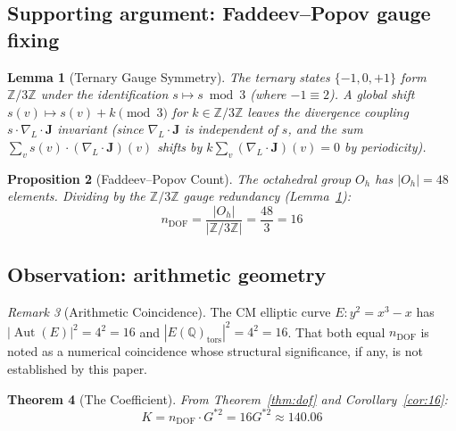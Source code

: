 \documentclass[12pt]{article}
\newtheorem{theorem}{Theorem}[section]
\newtheorem{proposition}[theorem]{Proposition}
\newtheorem{lemma}[theorem]{Lemma}
\theoremstyle{definition}
\theoremstyle{remark}
\newtheorem{remark}[theorem]{Remark}
\begin{document}
\subsection{Supporting argument: Faddeev--Popov gauge fixing}

\begin{lemma}[Ternary Gauge Symmetry]
\label{lem:z3}
The ternary states $\{-1, 0, +1\}$ form $\mathbb{Z}/3\mathbb{Z}$ under the identification $s \mapsto s \bmod 3$ (where $-1 \equiv 2$). A global shift $s(v) \mapsto s(v) + k \pmod{3}$ for $k \in \mathbb{Z}/3\mathbb{Z}$ leaves the divergence coupling $s \cdot \nabla_L \cdot \mathbf{J}$ invariant (since $\nabla_L \cdot \mathbf{J}$ is independent of $s$, and the sum $\sum_v s(v) \cdot (\nabla_L \cdot \mathbf{J})(v)$ shifts by $k \sum_v (\nabla_L \cdot \mathbf{J})(v) = 0$ by periodicity).
\end{lemma}

\begin{proposition}[Faddeev--Popov Count]
\label{prop:fp}
The octahedral group $O_h$ has $|O_h| = 48$ elements. Dividing by the $\mathbb{Z}/3\mathbb{Z}$ gauge redundancy (Lemma~\ref{lem:z3}):
\begin{equation}
    n_{\mathrm{DOF}} = \frac{|O_h|}{|\mathbb{Z}/3\mathbb{Z}|} = \frac{48}{3} = 16
\end{equation}
\end{proposition}

\subsection{Observation: arithmetic geometry}

\begin{remark}[Arithmetic Coincidence]
\label{rmk:arith}
The CM elliptic curve $E\!: y^2 = x^3 - x$ has $|\operatorname{Aut}(E)|^2 = 4^2 = 16$ and $|E(\mathbb{Q})_{\mathrm{tors}}|^2 = 4^2 = 16$. That both equal $n_{\mathrm{DOF}}$ is noted as a numerical coincidence whose structural significance, if any, is not established by this paper.
\end{remark}

\begin{theorem}[The Coefficient]
\label{thm:K}
From Theorem~\ref{thm:dof} and Corollary~\ref{cor:16}:
\begin{equation}
    \boxed{\;K = n_{\mathrm{DOF}} \cdot G^{*2} = 16G^{*2} \approx 140.06\;}
    \label{eq:K}
\end{equation}
\end{theorem}
\end{document}
